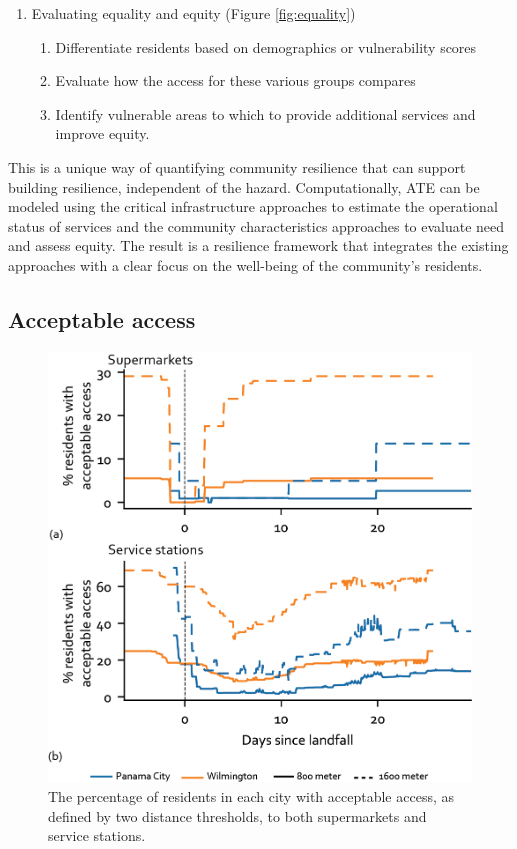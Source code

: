 \documentclass[9pt,twocolumn,twoside,lineno]{pnas-new}
\begin{document}
\begin{enumerate}[topsep=1pt,itemsep=0em,partopsep=1ex,parsep=1ex]
\begin{enumerate}[topsep=0pt,itemsep=-2pt,partopsep=1ex,parsep=1ex]
    \end{enumerate}
    \item Evaluating equality and equity (Figure \ref{fig:equality})
    \begin{enumerate}[topsep=0pt,itemsep=-2pt,partopsep=1ex,parsep=1ex]
        \item Differentiate residents based on demographics or vulnerability scores
        \item Evaluate how the access for these various groups compares
        \item Identify vulnerable areas to which to provide additional services and improve equity.
    \end{enumerate}
\end{enumerate}

This is a unique way of quantifying community resilience that can support building resilience, independent of the hazard.
Computationally, ATE can be modeled using the critical infrastructure approaches to estimate the operational status of services and the community characteristics approaches to evaluate need and assess equity. 
The result is a resilience framework that integrates the existing approaches with a clear focus on the well-being of the community's residents.

\subsection*{Acceptable access}
\begin{figure}
    \centering
    \includegraphics[width=\linewidth]{report/fig/sufficient_only.png}
    \caption{The percentage of residents in each city with acceptable access, as defined by two distance thresholds, to both supermarkets and service stations. 
    }
    \label{fig:threshold}
\end{figure}
\end{document}

